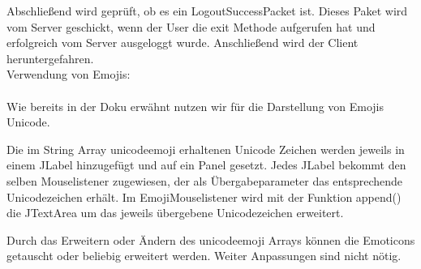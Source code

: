 \begin{itemize}
    
    Abschließend wird geprüft, ob es ein LogoutSuccessPacket ist. Dieses Paket wird vom Server geschickt, wenn der
    User die exit Methode aufgerufen hat und erfolgreich vom Server ausgeloggt wurde. Anschließend wird der Client
    heruntergefahren.\\
    
Verwendung von Emojis: \\\\
	Wie bereits in der Doku erwähnt nutzen wir für die Darstellung von Emojis Unicode.
	
	Die im String Array unicodeemoji erhaltenen Unicode Zeichen werden jeweils in einem JLabel hinzugefügt und auf ein Panel gesetzt. Jedes JLabel bekommt den selben Mouselistener zugewiesen, der als Übergabeparameter das entsprechende Unicodezeichen erhält. Im EmojiMouselistener wird mit der Funktion append() die JTextArea um das jeweils übergebene Unicodezeichen erweitert.
	
	Durch das Erweitern oder Ändern des unicodeemoji Arrays können die Emoticons getauscht oder beliebig erweitert werden. Weiter Anpassungen sind nicht nötig.
\end{itemize}


